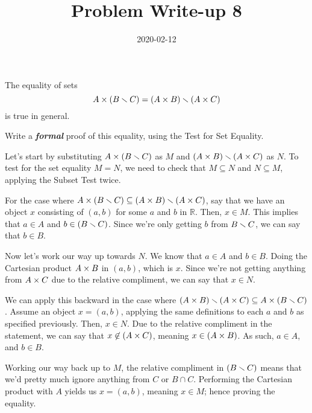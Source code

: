 \documentclass[a4paper,12pt]{article}
\title{Problem Write-up 8}
\date{2020-02-12}
\begin{document}
	\begin{problem}
		The equality of sets \[A \times (B \smallsetminus C) = (A \times B) \smallsetminus (A \times C)\] is true in general.
		
		Write a \textbf{\textit{formal}} proof of this equality, using the Test for Set Equality.	
	\end{problem}
	\begin{answer}
		Let's start by substituting \(A \times (B \smallsetminus C)\) as \(M\) and \((A \times B) \smallsetminus (A \times C)\) as \(N\). To test for the set equality \(M = N\), we need to check that \(M \subseteq N\) and \(N \subseteq M\), applying the Subset Test twice. 

		For the case where \(A \times (B \smallsetminus C) \subseteq (A \times B) \smallsetminus (A \times C)\), say that we have an object \(x\) consisting of \((a,b)\) for some \(a\) and \(b\) in \(\mathbb{R}\). Then, \(x \in M\). This implies that \(a \in A\) and \(b \in (B \smallsetminus C)\). Since we're only getting \(b\) from \(B \smallsetminus C\), we can say that \(b \in B\).

		Now let's work our way up towards \(N\). We know that \(a \in A\) and \(b \in B\). Doing the Cartesian product \(A \times B\) in \((a,b)\), which is \(x\). Since we're not getting anything from \(A \times C\) due to the relative compliment, we can say that \(x \in N\).

		We can apply this backward in the case where \((A \times B) \smallsetminus (A \times C) \subseteq A \times (B \smallsetminus C)\). Assume an object \(x = (a,b)\), applying the same definitions to each \(a\) and \(b\) as specified previously. Then, \(x \in N\). Due to the relative compliment in the statement, we can say that \(x \not\in (A \times C)\), meaning \(x \in (A \times B)\). As such, \(a \in A\), and \(b \in B\).

		Working our way back up to \(M\), the relative compliment in \((B \smallsetminus C)\) means that we'd pretty much ignore anything from \(C\) or \(B \cap C\). Performing the Cartesian product with \(A\) yields us \(x = (a,b)\), meaning \(x \in M\); hence proving the equality.
	\end{answer}
\end{document}
